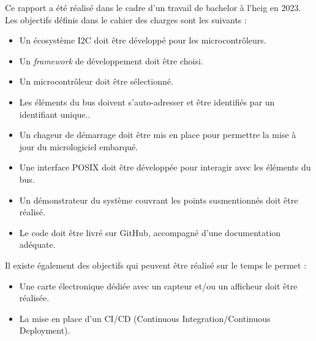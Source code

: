 Ce rapport a été réalisé dans le cadre d'un travail de bachelor à l'\gls{heig} en 2023.
Les objectifs définis dans le cahier des charges sont les suivants :

\begin{itemize}
    \item Un écosystème I2C doit être développé pour les microcontrôleurs.
    \item Un \textit{\gls{framework}} de développement doit être choisi.
    \item Un microcontrôleur doit être sélectionné.
    \item Les éléments du bus doivent s'auto-adresser et être identifiés par un identifiant unique..
    \item Un chageur de démarrage doit être mis en place pour permettre la mise à jour du micrologiciel embarqué.
    \item Une interface POSIX doit être développée pour interagir avec les éléments du bus.
    \item Un démonstrateur du système couvrant les points susmentionnés doit être réalisé.
    \item Le code doit être livré sur GitHub, accompagné d'une documentation adéquate.
\end{itemize}

Il existe également des objectifs qui peuvent être réalisé sur le temps le permet :

\begin{itemize}
    \item Une carte électronique dédiée avec un capteur et/ou un afficheur doit être réalisée.
    \item La mise en place d'un CI/CD (Continuous Integration/Continuous Deployment).
\end{itemize}

